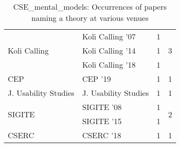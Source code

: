 \begin{table*}[t]
\begin{tabular}{llrr}
\multirow{3}{*}{Koli Calling } & Koli Calling '07 & 1 & \multirow{3}{*}{3}\\
& Koli Calling '14 & 1 &\\
& Koli Calling '18 & 1 &\\
\multirow{1}{*}{CEP } & CEP '19 & 1 & \multirow{1}{*}{1}\\
\multirow{1}{*}{J. Usability Studies} & J. Usability Studies & 1 & \multirow{1}{*}{1}\\
\multirow{2}{*}{SIGITE } & SIGITE '08 & 1 & \multirow{2}{*}{2}\\
& SIGITE '15 & 1 &\\
\multirow{1}{*}{CSERC } & CSERC '18 & 1 & \multirow{1}{*}{1}\\
\end{tabular}
\caption{CSE\_mental\_models: Occurrences of papers naming a theory at various venues}
\end{table*}